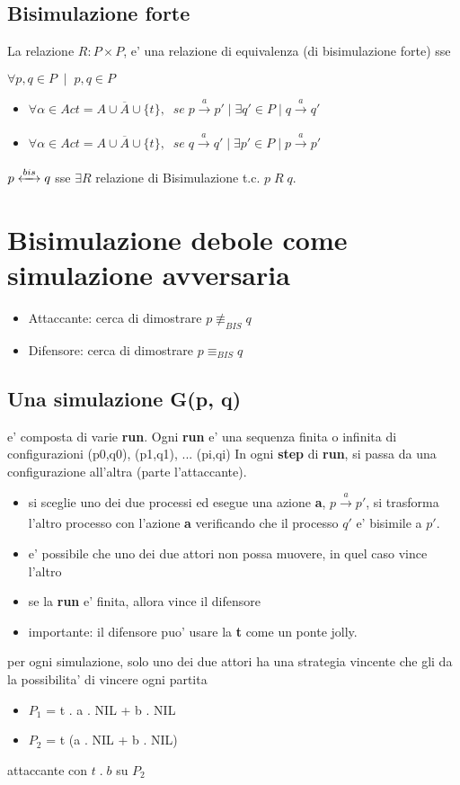 \subsection{Bisimulazione forte}

La relazione $R : P \times P$,  e' una relazione di equivalenza (di bisimulazione forte) sse

$\forall p,q \in P \;\; | \;\; p,q \in P$ 

\begin{itemize}
  \item $\forall \alpha \in Act = A \cup \overline A \cup \{t\}, \;\; se \; p \xrightarrow[]{a} p' \; | \; \exists q' \in P \; | \; q \xrightarrow[]{a} q'$
  \item $\forall \alpha \in Act = A \cup \overline A \cup \{t\}, \;\; se \; q \xrightarrow[]{a} q' \; | \; \exists p' \in P \; | \; p \xrightarrow[]{a} p'$
\end{itemize}

$p \xleftrightarrow[]{bis} q$ sse $\exists R$ relazione di Bisimulazione t.c. $p \; R \; q$.

\section{Bisimulazione debole come simulazione avversaria}

\begin{itemize}
  \item Attaccante: cerca di dimostrare $p \not \equiv_{BIS} q$
  \item Difensore: cerca di dimostrare $p \equiv_{BIS} q$
\end{itemize}

\subsection{Una simulazione G(p, q)}

e' composta di varie \textbf{run}. Ogni \textbf{run} e' una sequenza finita o infinita di configurazioni (p0,q0), (p1,q1), ... (pi,qi)
In ogni \textbf{step} di \textbf{run}, si passa da una configurazione all'altra (parte l'attaccante).

\begin{itemize}
  \item si sceglie uno dei due processi ed esegue una azione \textbf{a}, $p \xrightarrow[]{a} p'$, si trasforma l'altro processo con l'azione \textbf{a} verificando che il processo $q'$ e' bisimile a $p'$.
  \item e' possibile che uno dei due attori non possa muovere, in quel caso vince l'altro
  \item se la \textbf{run} e' finita, allora vince il difensore
  \item importante: il difensore puo' usare la \textbf{t} come un ponte jolly.
\end{itemize}

per ogni simulazione, solo uno dei due attori ha una strategia vincente che gli da la possibilita' di vincere ogni partita

\begin{itemize}
  \item $P_1$ = t . a . NIL + b . NIL
  \item $P_2$ = t (a . NIL + b . NIL)
\end{itemize}

attaccante con $ t \; . \; b$ su $P_2$

